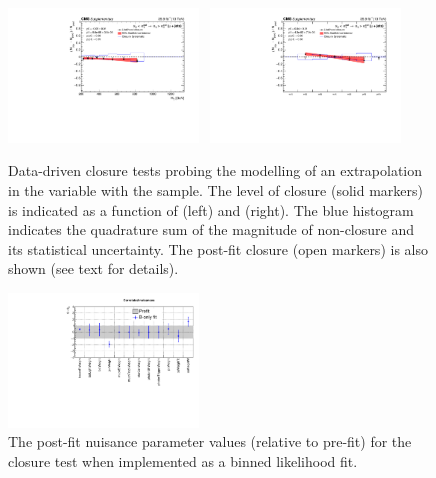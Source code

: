 \begin{figure}[h!]
  \begin{center}
    \includegraphics[width=0.45\textwidth]{figures/closureTests/AlphaT/SingleMu_alphaTExtrapolation_ht.pdf}~
    \includegraphics[width=0.45\textwidth]{figures/closureTests/AlphaT/SingleMu_alphaTExtrapolation_nJet.pdf}\\
    \caption{Data-driven closure tests probing the modelling of an
      extrapolation in the \alphat variable with the \mj sample. The
      level of closure (solid markers) is indicated as a function of
      \scalht (left) and \njet (right). The blue histogram indicates
      the quadrature sum of the magnitude of non-closure and its
      statistical uncertainty. The post-fit closure (open markers) is
      also shown (see text for details).  }
    \label{fig:closure_AlphaT_mu}
  \end{center} 
\end{figure}

\begin{figure}[h!]
  \begin{center}
    \includegraphics[width=0.45\textwidth]{figures/closureTests/AlphaT/AlphaT_Correlated_nuisances.pdf}
    \caption{The post-fit nuisance parameter values (relative to
      pre-fit) for the \alphat closure test when implemented as a
      binned likelihood fit.} 
    \label{fig:closure_AlphaT_LH_mu}
  \end{center} 
\end{figure}


